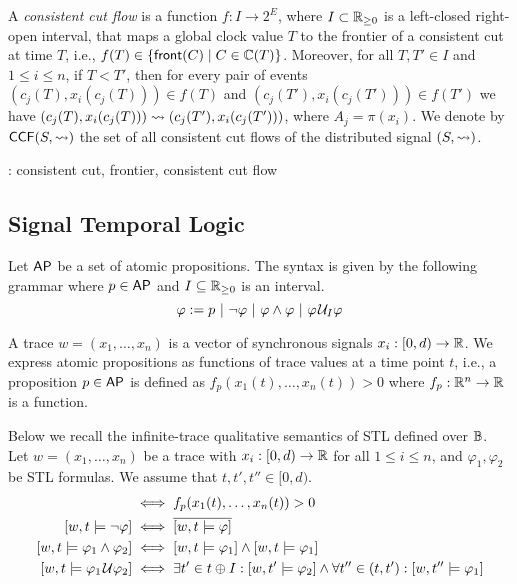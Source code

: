A \emph{consistent cut flow} is a function $f : I \to 2^E$, where $I \subset \mathbb{R}_{\geq 0}$ is a left-closed right-open interval, that maps a global clock value $T$ to the frontier of a consistent cut at time $T$, i.e., $f(T) \in \{\fr(C) \st C \in \CC(T)\}$.
Moreover, for all $T,T' \in I$ and $1 \leq i \leq n$, if $T < T'$, then for every pair of events $(c_j(T), x_i(c_j(T))) \in f(T)$ and $(c_j(T'), x_i(c_j(T'))) \in f(T')$ we have $(c_j(T), x_i(c_j(T))) \rightsquigarrow (c_j(T'), x_i(c_j(T')))$, where $A_j = \pi(x_i)$.
We denote by $\mathsf{CCF}(S,{\rightsquigarrow})$ the set of all consistent cut flows of the distributed signal $(S,{\rightsquigarrow})$.

\begin{example}
	\TODO: consistent cut, frontier, consistent cut flow
\end{example}


\subsection{Signal Temporal Logic} \label{sec:stl}
Let $\mathsf{AP}$ be a set of atomic propositions.
The syntax is given by the following grammar where $p \in \mathsf{AP}$ and $I \subseteq \mathbb{R}_{\geq 0}$ is an interval.
$$ \varphi :=  p ~|~ \lnot \varphi ~|~ \varphi \land \varphi ~|~ \varphi \kern.1em\mathcal{U}_I \varphi$$

A trace $w = (x_1, \ldots, x_n)$ is a vector of synchronous signals $x_i : [0,d) \to \mathbb{R}$.
We express atomic propositions as functions of trace values at a time point $t$, i.e., a proposition $p \in \mathsf{AP}$ is defined as $f_p(x_1(t), \ldots, x_n(t)) > 0$ where $f_p : \mathbb{R}^n \to \mathbb{R}$ is a function.

Below we recall the infinite-trace qualitative semantics of STL defined over $\mathbb{B}$.
Let $w = (x_1, \ldots, x_n)$ be a trace with $x_i : [0,d) \to \mathbb{R}$ for all $1 \leq i \leq n$, and $\varphi_1, \varphi_2$ be STL formulas.
We assume that $t,t',t'' \in [0,d)$.
\begin{align*}
	[w,t \models p] &\iff f_p(x_1(t), \ldots, x_n(t)) > 0 \\
	[w,t \models \lnot \varphi] &\iff \overline{[w,t \models \varphi]} \\
	[w,t \models \varphi_1 \land \varphi_2] &\iff [w,t \models \varphi_1] \land [w,t \models \varphi_1] \\
	[w,t \models \varphi_1 \until \varphi_2] &\iff \exists t' \in t \oplus I : [w,t' \models \varphi_2] \land \forall t'' \in (t, t') : [w,t'' \models \varphi_1] \\
\end{align*}

